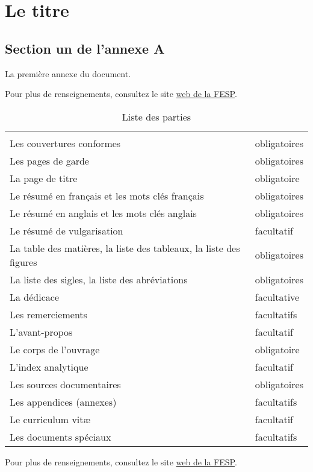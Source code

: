 \chapter{Le titre}

\section{Section un de l'annexe A}

La premi\`ere annexe du document.

Pour plus de renseignements, consultez le site \href{http://www.fesp.umontreal.ca}{web de la FESP}.
\begin{table}[htb]
	\renewcommand{\arraystretch}{1.25}
	\newcommand{\dotrule}[1]{\parbox[t]{#1}{\dotfill}}
	\centering
	\caption[Titre alternatif pour la table des mati\`eres]{Liste des parties}
	\label{tab:parties}
	\begin{tabular}{p{}@{\hspace{}}p{0.15\textwidth}}
		\hline\hline & \\[-3mm]
  		Les couvertures conformes 											& obligatoires			\\
		Les pages de garde 													& obligatoires			\\
		La page de titre 													& obligatoire			\\
		Le résumé en français et les mots clés français						& obligatoires			\\
		Le résumé en anglais et les mots clés anglais 						& obligatoires			\\
		Le résumé de vulgarisation											& facultatif			\\
		La table des mati\`eres, la liste des tableaux, la liste des figures 	& obligatoires			\\
		La liste des sigles, la liste des abréviations						& obligatoires			\\
		La dédicace															& facultative			\\
		Les remerciements 													& facultatifs			\\
		L'avant-propos 														& facultatif			\\
		Le corps de l'ouvrage												& obligatoire			\\
		L'index analytique													& facultatif			\\
		Les sources documentaires 											& obligatoires			\\
		Les appendices (annexes) 											& facultatifs			\\
		Le curriculum vit\ae{}												& facultatif			\\
		Les documents spéciaux 												& facultatifs			\\
		[3mm] \hline\hline
	\end{tabular}
\end{table}
Pour plus de renseignements, consultez le site \href{http://www.fesp.umontreal.ca}{web de la FESP}.
